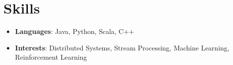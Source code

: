 \documentclass[letterpaper,11pt]{article}
\newcommand{\resumeItem}[2]{
  \item\small{
    \textbf{#1}{: #2 \vspace{-2pt}}
  }
}
\newcommand{\resumeSubItem}[2]{\resumeItem{#1}{#2}\vspace{-4pt}}
\newcommand{\resumeSubHeadingListStart}{\begin{itemize}[leftmargin=*]}
\newcommand{\resumeSubHeadingListEnd}{\end{itemize}}
\begin{document}

%
\section{Skills}
\resumeSubHeadingListStart
\item
\textbf{Languages}{: Java, Python, Scala, C++}
\item \vspace{-5pt}
\textbf{Interests}{: Distributed Systems, Stream Processing, Machine Learning, Reinforcement Learning}
\resumeSubHeadingListEnd


\end{document}
